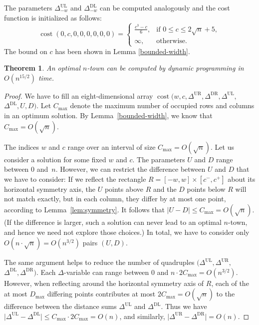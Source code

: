 \documentclass[preprint,authoryear,12pt]{elsarticle}
\DeclareMathOperator{\cost}{cost} \DeclareMathOperator{\dist}{dist}
\newcommand{\abs}[1]{\lvert #1 \rvert}
\newtheorem{theorem}{Theorem}
\begin{document}
The parameters $\Delta_{-w}^{\mathrm{UL}}$ and
$\Delta_{-w}^{\mathrm{DL}}$ can be computed analogously and the cost
function is initialized as follows:
$$
\cost(0,c,0,0,0,0,0,0) =
\begin{cases}
\frac{c^3-c}{6}, & \text{if } 0 \le c \le 2\sqrt{n}+5, \\
\infty, & \mathrm{otherwise.}
\end{cases}
$$
The bound on $c$ has been shown in Lemma \ref{bounded-width}.

\begin{theorem}
\label{running}
An optimal $n$-town can be computed by dynamic programming in
$O(n^{15/2})$ time.
\end{theorem}
\begin{proof}
  We have to fill an eight-dimensional array
  $\cost(w,c,\Delta^\mathrm{UR},\Delta^\mathrm{DR},\Delta^\mathrm{UL},$
  $\Delta^\mathrm{DL},U,D)$.  Let
  $C_{\max}$ denote the maximum number of occupied rows and columns in
  an optimum solution.  By Lemma~\ref{bounded-width}, we know that
  $C_{\max}=O(\sqrt n)$.

  The indices $w$ and $c$ range over an interval of size
  $C_{\max}=O(\sqrt n)$. Let us consider a solution for some fixed $w$
  and $c$.  The parameters $U$ and $D$ range between 0 and~$n$.  However,
  we can restrict the difference between $U$ and $D$ that we have to
  consider: If we reflect the rectangle
$R=[-w,w]\times[c^-,c^+]$  about its horizontal
  symmetry axis, the $U$ points above $R$ and the $D$ points below $R$
  will not match exactly, but in each column, they differ by at most
  one point, according to Lemma~\ref{lem:symmetry}. It follows that $\abs
  {U-D}\le C_{\max}=O(\sqrt n)$.  (If the difference is larger, such a
  solution can never lead to an optimal $n$-town, and hence we need
  not explore those choices.)  In total, we have to consider
  only $O(n\cdot\sqrt n)=O(n^{3/2})$ pairs $(U,D)$.

  The same argument helps to reduce the number of quadruples
  $(\Delta^\mathrm{UL},\Delta^\mathrm{UR},$ $\Delta^\mathrm{DL},\Delta^\mathrm{DR})$.
  Each $\Delta$-variable
  can range between 0 and $n\cdot 2C_{\max}= O(n^{3/2})$.
  However, when reflecting around the horizontal symmetry axis of $R$, each of the
at most $D_{\max}$ differing points contributes at most $2C_{\max}=
O(\sqrt n)$ to the difference between the distance sums
  $\Delta^\mathrm{UL}$ and $\Delta^\mathrm{DL}$. Thus we have
  $\abs{\Delta^\mathrm{UL}-\Delta^\mathrm{DL}}\le
C_{\max} \cdot 2C_{\max}=O(n)$, and similarly,
  $\abs{\Delta^\mathrm{UR}-\Delta^\mathrm{DR}}=O(n)$.


\end{proof}
\end{document}
